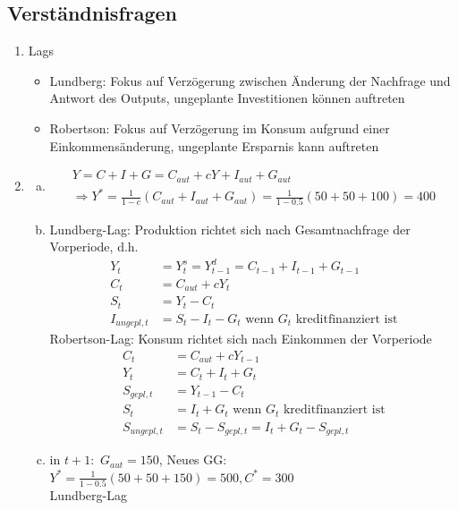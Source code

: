 \documentclass{scrartcl}
\begin{document}
\subsection{Verst\"{a}ndnisfragen}
\begin{enumerate}
  \item Lags
  \begin{itemize}
  \item Lundberg: Fokus auf Verz\"{o}gerung zwischen \"{A}nderung der Nachfrage und Antwort des Outputs, ungeplante Investitionen k\"{o}nnen auftreten
  \item Robertson: Fokus auf Verz\"{o}gerung im Konsum aufgrund einer Einkommens\"{a}nderung, ungeplante Ersparnis kann auftreten
  \end{itemize}
  \item \begin{enumerate}[a)]
      \item \begin{align*}
        Y = C+I+G = C_{aut} + cY + I_{aut}+ G_{aut} \\
        \Rightarrow Y^* = \frac{1}{1-c}(C_{aut}+I_{aut}+G_{aut})= \frac{1}{1-0.5}(50+50+100)=400
      \end{align*}
  \item Lundberg-Lag: Produktion richtet sich nach Gesamtnachfrage der Vorperiode, d.h.
  \begin{align*}
    Y_t &= Y_t^s = Y_{t-1}^d = C_{t-1} + I_{t-1}+G_{t-1}\\
    C_t &= C_{aut}+c Y_t\\
    S_t &= Y_t - C_t\\
    I_{ungepl,t} &= S_t - I_{t} - G_t \text{ wenn $G_t$ kreditfinanziert ist}
  \end{align*}
  Robertson-Lag: Konsum richtet sich nach Einkommen der Vorperiode
  \begin{align*}
    C_t &= C_{aut} + c Y_{t-1}\\
    Y_t &= C_t + I_t + G_t\\
    S_{gepl,t} &= Y_{t-1}-C_t\\
    S_t &= I_t + G_t \text{ wenn $G_t$ kreditfinanziert ist}\\
    S_{ungepl,t} &= S_t - S_{gepl,t} = I_t+G_t - S_{gepl,t}
  \end{align*}
  \item in $t+1:$ $G_{aut}=150$,
  Neues GG: $Y^* = \frac{1}{1-0.5}(50+50+150) = 500, C^* = 300$\\
  Lundberg-Lag\\
  \begin{tabular}{|c|c|c|c|c|}

\end{tabular}
\end{enumerate}
\end{enumerate}
\end{document}
